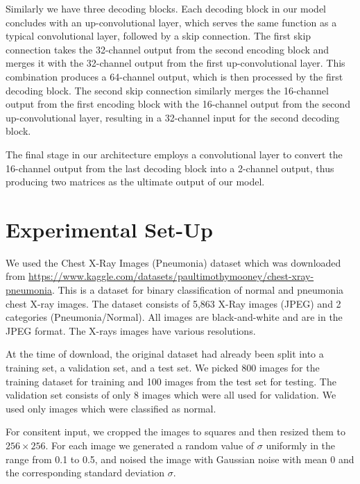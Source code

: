 \documentclass[12pt]{article}
\begin{document}
Similarly we have three decoding blocks.
Each decoding block in our model concludes with an up-convolutional layer, which serves the same function as a typical convolutional layer, followed by a skip connection. The first skip connection takes the 32-channel output from the second encoding block and merges it with the 32-channel output from the first up-convolutional layer. This combination produces a 64-channel output, which is then processed by the first decoding block. The second skip connection similarly merges the 16-channel output from the first encoding block with the 16-channel output from the second up-convolutional layer, resulting in a 32-channel input for the second decoding block.

The final stage in our architecture employs a convolutional layer to convert the 16-channel output from the last decoding block into a 2-channel output, thus producing two matrices as the ultimate output of our model.



\section{Experimental Set-Up}



We used the Chest X-Ray Images (Pneumonia) dataset which was downloaded from \url{https://www.kaggle.com/datasets/paultimothymooney/chest-xray-pneumonia}. 
This is a dataset for binary classification of normal and pneumonia chest X-ray images. 
The dataset consists of 5,863 X-Ray images (JPEG) and 2 categories (Pneumonia/Normal).
All images are black-and-white and are in the JPEG format.
The X-rays images have various resolutions.

At the time of download, the original dataset had already been split into a training set, a validation set, and a test set.
We picked 800 images for the training dataset for training and 100 images from the test set for testing. The validation set consists of only 8 images which were all used for validation.
We used only images which were classified as normal.

For consitent input, we cropped the images to squares and then resized them to $256 \times 256$.
For each image we generated a random value of $\sigma$ uniformly in the range from 0.1 to 0.5, and noised the image with Gaussian noise with mean 0 and the corresponding standard deviation $\sigma$.
\end{document}

